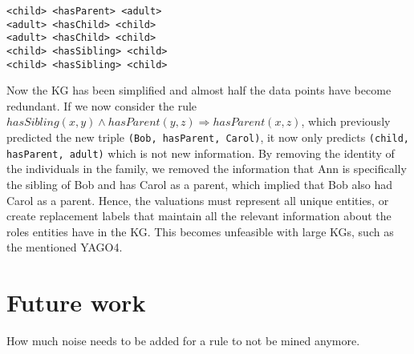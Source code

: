\begin{example}
\begin{lstlisting}[]
<child> <hasParent> <adult>
<adult> <hasChild> <child>
<adult> <hasChild> <child>
<child> <hasSibling> <child>
<child> <hasSibling> <child>
\end{lstlisting}
\label{mini_simple_KG_rules}
\end{example}

Now the KG has been simplified and almost half the data points have become redundant. If we now consider the rule $hasSibling(x, y) \wedge hasParent(y,z) \Rightarrow hasParent(x,z)$, which previously predicted the new triple \texttt{(Bob, hasParent, Carol)}, it now only predicts \texttt{(child, hasParent, adult)} which is not new information. By removing the identity of the individuals in the family, we removed the information that Ann is specifically the sibling of Bob and has Carol as a parent, which implied that Bob also had Carol as a parent. Hence, the valuations must represent all unique entities, or create replacement labels that maintain all the relevant information about the roles entities have in the KG. This becomes unfeasible with large KGs, such as the mentioned YAGO4.

\section{Future work}
How much noise needs to be added for a rule to not be mined anymore.